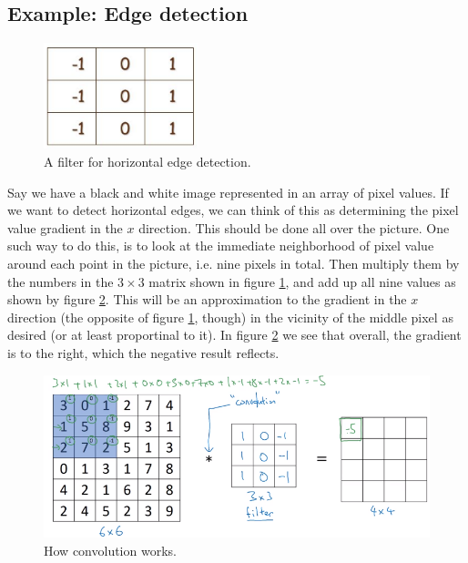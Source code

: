 \documentclass[12pt, a4paper]{article}
\numberwithin{equation}{section}
\begin{document}
\subsection{Example: Edge detection}

\begin{figure}
\centering
\includegraphics[width=0.4\textwidth]{horizontal_edge}
\caption{A filter for horizontal edge detection.}
\label{fig:horizontal_edge}
\end{figure}

Say we have a black and white image represented in an array of pixel values. If we want to detect horizontal edges, we can think of this as determining the pixel value gradient in the $x$ direction. This should be done all over the picture. One such way to do this, is to look at the immediate neighborhood of pixel value around each point in the picture, i.e. nine pixels in total. Then multiply them by the numbers in the $3\times 3$ matrix shown in figure \ref{fig:horizontal_edge}, and add up all nine values as shown by figure \ref{fig:convolutional_filter}. This will be an approximation to the gradient in the $x$ direction (the opposite of figure \ref{fig:horizontal_edge}, though) in the vicinity of the middle pixel as desired (or at least proportinal to it). In figure \ref{fig:convolutional_filter} we see that overall, the gradient is to the right, which the negative result reflects.

\begin{figure}
\centering
\includegraphics[width=\textwidth]{convolutional_filter}
\caption{How convolution works.}
\label{fig:convolutional_filter}
\end{figure}
\end{document}
